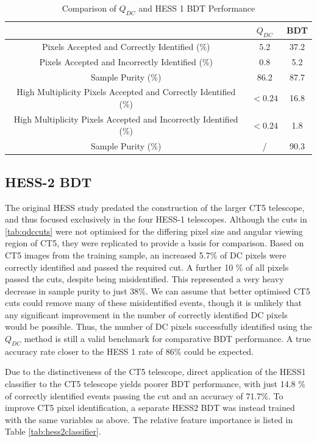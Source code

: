 \documentclass{article}
\begin{document}
\begin{table}[h!]
  \centering
  \caption{Comparison of $Q_{DC}$ and HESS 1 BDT Performance}
  \label{tab:qdcbdtcomparison1}
  \begin{tabular}{ccc}
    \toprule
    & $Q_{DC}$ & BDT\\
    \midrule
    Pixels Accepted and Correctly Identified (\%) & 5.2 & 37.2\\
   Pixels Accepted and Incorrectly Identified (\%) & 0.8 & 5.2\\
    Sample Purity (\%) & 86.2 & 87.7 \\
    \midrule
    High Multiplicity Pixels Accepted and Correctly Identified (\%) & $<0.24$ & 16.8\\
    High Multiplicity Pixels Accepted and Incorrectly Identified (\%) & $<0.24$ & 1.8\\
    Sample Purity (\%) & / & 90.3\\
    \bottomrule
  \end{tabular}
\end{table}

\subsection{HESS-2 BDT}
The original HESS study predated the construction of the larger CT5 telescope, and thus focused exclusively in the four HESS-1 telescopes. Although the cuts in \ref{tab:qdccuts} were not optimised for the differing pixel size and angular viewing region of CT5, they were replicated to provide a basis for comparison. Based on CT5 images from the training sample, an increased 5.7\% of DC pixels were correctly identified and passed the required cut. A further 10 \% of all pixels passed the cuts, despite being misidentified. This represented a very heavy decrease in sample purity to just 38\%. We can assume that better optimised CT5 cuts could remove many of these misidentified events, though it is unlikely that any significant improvement in the number of correctly identified DC pixels would be possible. Thus, the number of DC pixels successfully identified using the $Q_{DC}$ method is still a valid benchmark for comparative BDT performance. A true accuracy rate closer to the HESS 1 rate of 86\% could be expected. 

Due to the distinctiveness of the CT5 telescope, direct application of the HESS1 classifier to the CT5 telescope yields poorer BDT performance, with just 14.8 \% of correctly identified events passing the cut and an accuracy of 71.7\%. To improve CT5 pixel identification, a separate HESS2 BDT was instead trained with the same variables as above. The relative feature importance is listed in Table \ref{tab:hess2classifier}. 
\end{document}
